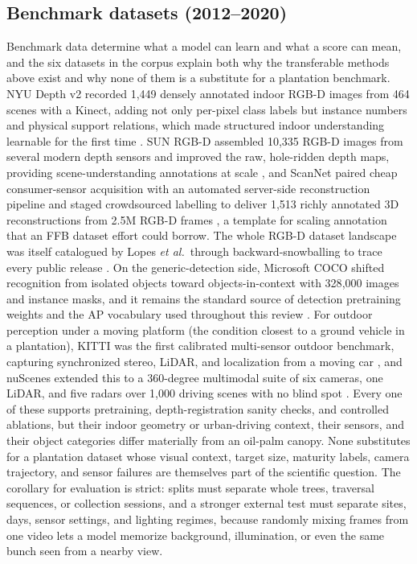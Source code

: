 \subsection{Benchmark datasets (2012--2020)}

Benchmark data determine what a model can learn and what a score can mean, and the six datasets in the corpus explain both why the transferable methods above exist and why none of them is a substitute for a plantation benchmark. NYU Depth v2 recorded 1{,}449 densely annotated indoor RGB-D images from 464 scenes with a Kinect, adding not only per-pixel class labels but instance numbers and physical support relations, which made structured indoor understanding learnable for the first time \cite{silberman2012nyu}. SUN RGB-D assembled 10{,}335 RGB-D images from several modern depth sensors and improved the raw, hole-ridden depth maps, providing scene-understanding annotations at scale \cite{song2015sunrgbd}, and ScanNet paired cheap consumer-sensor acquisition with an automated server-side reconstruction pipeline and staged crowdsourced labelling to deliver 1{,}513 richly annotated 3D reconstructions from 2.5M RGB-D frames \cite{dai2017scannet}, a template for scaling annotation that an FFB dataset effort could borrow. The whole RGB-D dataset landscape was itself catalogued by Lopes \textit{et al.}\ through backward-snowballing to trace every public release \cite{lopes2022rgbddatasets}. On the generic-detection side, Microsoft COCO shifted recognition from isolated objects toward objects-in-context with 328{,}000 images and instance masks, and it remains the standard source of detection pretraining weights and the AP vocabulary used throughout this review \cite{lin2014coco}. For outdoor perception under a moving platform (the condition closest to a ground vehicle in a plantation), KITTI was the first calibrated multi-sensor outdoor benchmark, capturing synchronized stereo, LiDAR, and localization from a moving car \cite{geiger2012kitti}, and nuScenes extended this to a 360-degree multimodal suite of six cameras, one LiDAR, and five radars over 1{,}000 driving scenes with no blind spot \cite{caesar2020nuscenes}. Every one of these supports pretraining, depth-registration sanity checks, and controlled ablations, but their indoor geometry or urban-driving context, their sensors, and their object categories differ materially from an oil-palm canopy. None substitutes for a plantation dataset whose visual context, target size, maturity labels, camera trajectory, and sensor failures are themselves part of the scientific question. The corollary for evaluation is strict: splits must separate whole trees, traversal sequences, or collection sessions, and a stronger external test must separate sites, days, sensor settings, and lighting regimes, because randomly mixing frames from one video lets a model memorize background, illumination, or even the same bunch seen from a nearby view.

